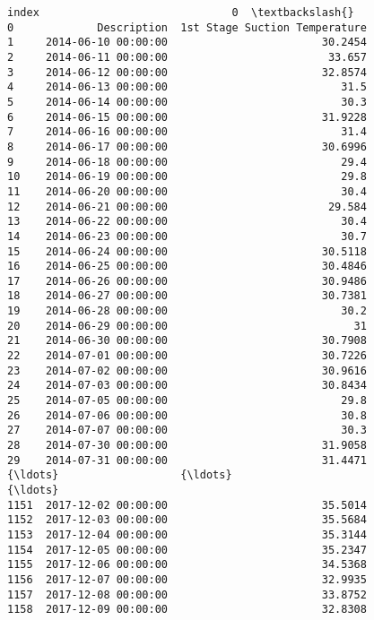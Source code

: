 \documentclass[11pt]{article}
\makeatletter
\newcommand{\boxspacing}{\kern\kvtcb@left@rule\kern\kvtcb@boxsep}
\newcommand{\prompt}[4]{
        \ttfamily\llap{{\color{#2}[#3]:\hspace{3pt}#4}}\vspace{-\baselineskip}
    }
\makeatother
\begin{document}
            \begin{tcolorbox}[breakable, size=fbox, boxrule=.5pt, pad at break*=1mm, opacityfill=0]
\prompt{Out}{outcolor}{7}{\boxspacing}
\begin{Verbatim}[commandchars=\\\{\}]
                    index                              0  \textbackslash{}
0             Description  1st Stage Suction Temperature
1     2014-06-10 00:00:00                        30.2454
2     2014-06-11 00:00:00                         33.657
3     2014-06-12 00:00:00                        32.8574
4     2014-06-13 00:00:00                           31.5
5     2014-06-14 00:00:00                           30.3
6     2014-06-15 00:00:00                        31.9228
7     2014-06-16 00:00:00                           31.4
8     2014-06-17 00:00:00                        30.6996
9     2014-06-18 00:00:00                           29.4
10    2014-06-19 00:00:00                           29.8
11    2014-06-20 00:00:00                           30.4
12    2014-06-21 00:00:00                         29.584
13    2014-06-22 00:00:00                           30.4
14    2014-06-23 00:00:00                           30.7
15    2014-06-24 00:00:00                        30.5118
16    2014-06-25 00:00:00                        30.4846
17    2014-06-26 00:00:00                        30.9486
18    2014-06-27 00:00:00                        30.7381
19    2014-06-28 00:00:00                           30.2
20    2014-06-29 00:00:00                             31
21    2014-06-30 00:00:00                        30.7908
22    2014-07-01 00:00:00                        30.7226
23    2014-07-02 00:00:00                        30.9616
24    2014-07-03 00:00:00                        30.8434
25    2014-07-05 00:00:00                           29.8
26    2014-07-06 00:00:00                           30.8
27    2014-07-07 00:00:00                           30.3
28    2014-07-30 00:00:00                        31.9058
29    2014-07-31 00:00:00                        31.4471
{\ldots}                   {\ldots}                            {\ldots}
1151  2017-12-02 00:00:00                        35.5014
1152  2017-12-03 00:00:00                        35.5684
1153  2017-12-04 00:00:00                        35.3144
1154  2017-12-05 00:00:00                        35.2347
1155  2017-12-06 00:00:00                        34.5368
1156  2017-12-07 00:00:00                        32.9935
1157  2017-12-08 00:00:00                        33.8752
1158  2017-12-09 00:00:00                        32.8308

\end{Verbatim}
\end{tcolorbox}
\end{document}
